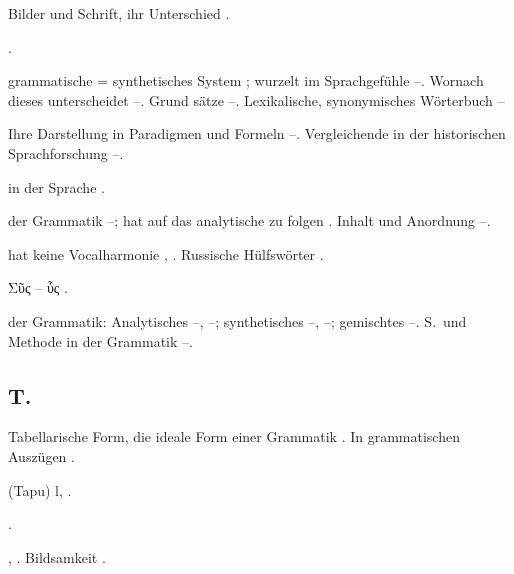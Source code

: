 \begin{register}
 Bilder und Schrift, ihr Unterschied \pageref{sp.128}.

 \pageref{sp.353}.


 grammatische = synthetisches System \pageref{sp.94}; wurzelt im Sprachgefühle \pageref{sp.97}–\pageref{sp.98}. Wornach dieses unterscheidet \pageref{sp.98}–\pageref{sp.99}. Grund sätze \pageref{sp.99}–\pageref{sp.100}. Lexikalische, synonymisches Wörterbuch \pageref{sp.123}–\pageref{sp.124}

  Ihre Darstellung in Paradigmen und Formeln \pageref{sp.117}–\pageref{sp.118}. Vergleichende in der historischen Sprachforschung \pageref{sp.137}–\pageref{sp.138}.

 in der Sprache \pageref{sp.81}.


 der Grammatik \pageref{sp.85}–\pageref{sp.86}; hat auf das analytische zu folgen \pageref{sp.86}. Inhalt und Anordnung \pageref{sp.94}–\pageref{sp.104}.

 hat keine Vocalharmonie \pageref{sp.149}, \pageref{sp.403}. Russische Hülfswörter \pageref{sp.273}.

Σῦς – ὗς \pageref{sp.202}.

 der Grammatik: Analytisches \pageref{sp.85}–\pageref{sp.86}, \pageref{sp.88}–\pageref{sp.93}; synthetisches \pageref{sp.85}–\pageref{sp.86}, \pageref{sp.94}–\pageref{sp.104}; gemischtes \pageref{sp.91}–\pageref{sp.92}. S.~und Methode in der Grammatik \pageref{sp.109}–\pageref{sp.110}.

\subsection*{T.}\label{reg.T}

 Tabellarische Form, die ideale Form einer Grammatik \pageref{sp.85}. In grammatischen Auszügen \pageref{sp.108}.

 (Tapu) l\pageref{sp.66}, \pageref{sp.245}.

 \pageref{sp.20}.

 \pageref{sp.257}, \pageref{sp.266}\sed{, \pageref{sp.363}}. Bildsamkeit \pageref{sp.349}.


\end{register}
